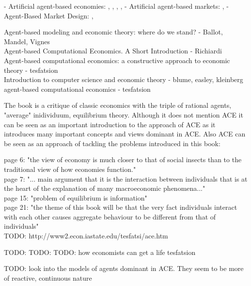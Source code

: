 - Artificial agent-based economies: \cite{tesfatsion_agent-based_2006}, \cite{gintis_emergence_2006}, \cite{gintis_dynamics_2007}, \cite{gaffeo_adaptive_2008}, \cite{botta_functional_2011}
- Artificial agent-based markets: \cite{mackie-mason_chapter_2006}, \cite{darley_nasdaq_2007}
- Agent-Based Market Design: \cite{marks_chapter_2006}, \cite{budish_editors_2015}

\cite{mandel_2015} Agent-based modeling and economic theory: where do we stand? - Ballot, Mandel, Vignes \\
\cite{richiardi_2007} Agent-based Computational Economics. A Short Introduction - Richiardi \\
\cite{tesfatsion_2006} Agent-based computational economics: a constructive approach to economic theory - tesfatsion \\
\cite{kleinberg_easley_2015} Introduction to computer science and economic theory - blume, easley, kleinberg \\
\cite{tesfatsion_2002} agent-based computational economics - tesfatsion 

The book \cite{KirmanComplex2010} is a critique of classic economics with the triple of rational agents, "average" inidividuum, equilibrium theory. Although it does not mention ACE it  can be seen as an important introduction to the approach of ACE as it introduces many important concepts and views dominant in ACE. Also ACE can be seen as an approach of tackling the problems introduced in this book: 

page 6: "the view of economy is much closer to that of social insects than to the traditional view of how economies function." \\
page 7: "... main argument that it is the interaction between individuals that is at the heart of the explanation of many macroeconomic phenomena..." \\
page 15: "problem of equilibrium is information" \\
page 21: "the theme of this book will be that the very fact individuals interact with each other causes aggregate behaviour to be different from that of individuals" \\

TODO: http://www2.econ.iastate.edu/tesfatsi/ace.htm

TODO: \cite{Kirman2001}
TODO: \cite{Kaminski2013}
TODO: how economists can get a life  tesfatsion

TODO: look into the models of agents dominant in ACE. They seem to be more of reactive, continuous nature


